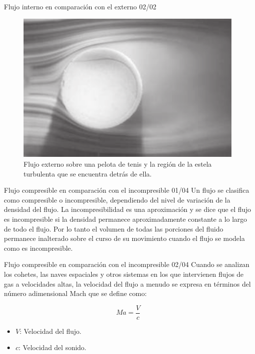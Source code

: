 \begin{frame}{Flujo interno en comparación con el externo 02/02}
\justifying
\begin{figure}[H]
\centering
\includegraphics[scale=0.25]{Section_Files/imagenes/sec01_0101_Fig01-18.png}
\caption{Flujo externo sobre una pelota de tenis y la región de la estela turbulenta que se encuentra detrás de ella.}
\label{fig: Figura1-18}
\end{figure}
\end{frame}
	
\begin{frame}{Flujo compresible en comparación con el incompresible 01/04}
\justifying
Un flujo se clasifica como compresible o incompresible, dependiendo del nivel de variación de la densidad del flujo. La incompresibilidad es una aproximación y se dice que el flujo es incompresible si la densidad permanece aproximadamente constante a lo largo de todo el flujo. Por lo tanto el volumen de todas las porciones del fluido permanece inalterado sobre el curso de su movimiento cuando el flujo se modela como es incompresible.
\end{frame}
	
\begin{frame}{Flujo compresible en comparación con el incompresible 02/04}
\justifying
Cuando se analizan los cohetes, las naves espaciales y otros sistemas en los que intervienen flujos de gas a velocidades altas, la velocidad del flujo a menudo se expresa en términos del número adimensional Mach que se define como:
	
\begin{equation}
\ Ma = \dfrac{V}{c}
\end{equation}
\begin{itemize}
\item $V$: Velocidad del flujo.
\item $c$: Velocidad del sonido.
\end{itemize}
\end{frame}
	
